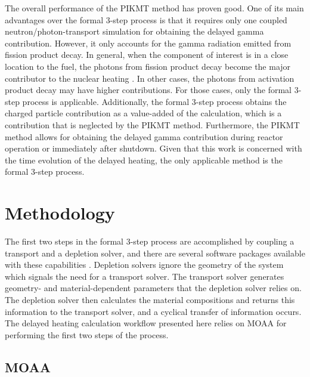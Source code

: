 \documentclass{style/nseJournal}
\begin{document}
The overall performance of the PIKMT method has proven good.
One of its main advantages over the formal 3-step process is that it requires only one coupled neutron/photon-transport simulation for obtaining the delayed gamma contribution.
However, it only accounts for the gamma radiation emitted from fission product decay.
In general, when the component of interest is in a close location to the fuel, the photons from fission product decay become the major contributor to the nuclear heating \cite{lemaire_estimation_2015}.
In other cases, the photons from activation product decay may have higher contributions.
For those cases, only the formal 3-step process is applicable.
Additionally, the formal 3-step process obtains the charged particle contribution as a value-added of the calculation, which is a contribution that is neglected by the PIKMT method.
Furthermore, the PIKMT method allows for obtaining the delayed gamma contribution during reactor operation or immediately after shutdown.
Given that this work is concerned with the time evolution of the delayed heating, the only applicable method is the formal 3-step process.


\section{Methodology}
\label{sec:methodology}

The first two steps in the formal 3-step process are accomplished by coupling a transport and a depletion solver, and there are several software packages available with these capabilities \cite{mocup, monteburns, mcode, vesta}.
Depletion solvers ignore the geometry of the system which signals the need for a transport solver.
The transport solver generates geometry- and material-dependent parameters that the depletion solver relies on.
The depletion solver then calculates the material compositions and returns this information to the transport solver, and a cyclical transfer of information occurs.
The delayed heating calculation workflow presented here relies on MOAA for performing the first two steps of the process.


\subsection{MOAA}
\end{document}
